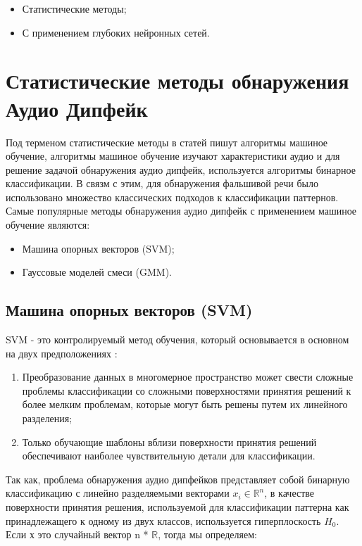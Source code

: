 \begin{itemize}
    \item Статистические методы;
    \item С применением глубоких нейронных сетей.
\end{itemize}

\section{Статистические методы обнаружения Аудио Дипфейк}

Под терменом статистические методы в статей пишут алгоритмы машиное обучение, алгоритмы машиное обучение изучают характеристики аудио и для решение задачой обнаружения аудио дипфейк, используется алгоритмы бинарное классификации.
В связм с этим, для обнаружения фальшивой речи было использовано множество классических подходов к классификации паттернов.
Самые популярные методы обнаружения аудио дипфейк с применением машиное обучение являются:

\begin{itemize}
    \item Машина опорных векторов (SVM);
    \item Гауссовые моделей смеси (GMM).
\end{itemize}

\subsection{Машина опорных векторов (SVM)}

SVM - это контролируемый метод обучения, который основывается в основном на двух предположениях \cite{hamza2022deepfake}:
\begin{enumerate}
    \item Преобразование данных в многомерное пространство может свести сложные проблемы классификации со сложными поверхностями принятия решений к более мелким проблемам, которые могут быть решены путем их линейного разделения;
    \item Только обучающие шаблоны вблизи поверхности принятия решений обеспечивают наиболее чувствительную детали для классификации.
\end{enumerate}

Так как, проблема обнаружения аудио дипфейков представляет собой бинарную классификацию с линейно разделяемыми векторами \(x_{i} \in \mathbb{R}^{n}\), в качестве поверхности принятия решения, используемой для классификации паттерна как принадлежащего к одному из двух классов, используется гиперплоскость \(H_{0}\). Если х это случайный вектор n * \(\mathbb{R}\), тогда мы определяем:

